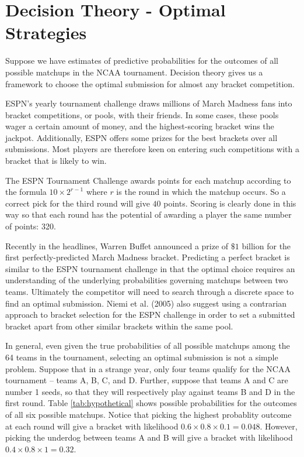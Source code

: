 \section{Decision Theory - Optimal Strategies}
Suppose we have estimates of predictive probabilities for the outcomes of all possible matchups in the NCAA tournament. Decision theory gives us a framework to choose the optimal submission for almost any bracket competition. 

ESPN's yearly tournament challenge draws millions of March Madness fans into bracket competitions, or pools, with their friends. In some cases, these pools wager a certain amount of money, and the highest-scoring bracket wins the jackpot. Additionally, ESPN offers some prizes for the best brackets over all submissions. Most players are therefore keen on entering such competitions with a bracket that is likely to win. 

The ESPN Tournament Challenge awards points for each matchup according to the formula $10\times2^{r-1}$ where $r$ is the round in which the matchup occurs. So a correct pick for the third round will give $40$ points. Scoring is clearly done in this way so that each round has the potential of awarding a player the same number of points: 320. 

Recently in the headlines, Warren Buffet announced a prize of $\$1$ billion for the first perfectly-predicted March Madness bracket. Predicting a perfect bracket is similar to the ESPN tournament challenge in that the optimal choice requires an understanding of the underlying probabilities governing matchups between two teams. Ultimately the competitor will need to search through a discrete space to find an optimal submission. Niemi et al. (2005) also suggest using a contrarian approach to bracket selection for the ESPN challenge in order to set a submitted bracket apart from other similar brackets within the same pool. 

In general, even given the true probabilities of all possible matchups among the 64 teams in the tournament, selecting an optimal submission is not a simple problem. Suppose that in a strange year, only four teams qualify for the NCAA tournament -- teams A, B, C, and D. Further, suppose that teams A and C are number 1 seeds, so that they will respectively play against teams B and D in the first round. Table \ref{tab:hypothetical} shows possible probabilities for the outcomes of all six possible matchups. Notice that picking the highest probablity outcome at each round will give a bracket with likelihood $0.6\times0.8\times0.1=0.048$. However, picking the underdog between teams A and B will give a bracket with likelihood $0.4\times0.8\times1=0.32$. 

